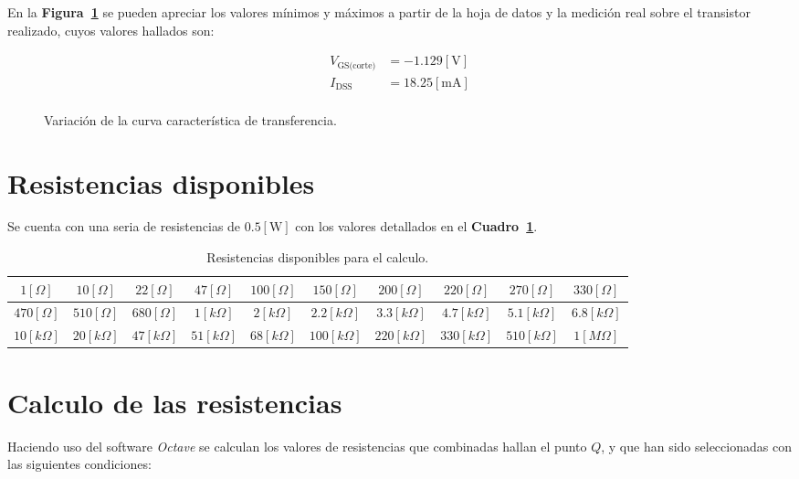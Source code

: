 \documentclass[letter,twoside,11pt]{article}
\begin{document}
En la \textbf{Figura~\ref{curve1}} se pueden apreciar los valores mínimos y
máximos a partir de la hoja de datos y la medición real sobre el transistor
realizado, cuyos valores hallados son:

\begin{equation*}
    \begin{split}
        V_{\text{GS(corte)}} &= -1.129[\text{V}]\\
        I_{\text{DSS}} &= 18.25[\text{mA}]\\
    \end{split}
\end{equation*}

\begin{figure}[!h]
    \centering
    
    \caption{Variación de la curva característica de transferencia.}
    \label{curve1}
\end{figure}

\section{Resistencias disponibles}
Se cuenta con una seria de resistencias de $0.5[\text{W}]$ con los valores
detallados en el \textbf{Cuadro~\ref{resistencias}}.

\begin{table}[!h]
\begin{center}
    \begin{tabular}{|c|c|c|c|c|c|c|c|c|c|}
    \hline
    $1[\Omega]$ & $10[\Omega]$ & $22[\Omega]$ & $47[\Omega]$ & $100[\Omega]$ &
    $150[\Omega]$ & $200[\Omega]$ & $220[\Omega]$ & $270[\Omega]$ &
    $330[\Omega]$
    \tabularnewline \hline
    $470[\Omega]$ & $510[\Omega]$ & $680[\Omega]$ & $1[k{\Omega}]$ &
    $2[k{\Omega}]$ & $2.2[k{\Omega}]$ & $3.3[k{\Omega}]$ & $4.7[k{\Omega}]$ &
    $5.1[k{\Omega}]$ & $6.8[k{\Omega}]$
    \tabularnewline \hline
    $10[k{\Omega}]$ & $20[k{\Omega}]$ & $47[k{\Omega}]$ & $51[k{\Omega}]$ &
    $68[k{\Omega}]$ & $100[k{\Omega}]$ & $220[k{\Omega}]$ & $330[k{\Omega}]$ &
    $510[k{\Omega}]$ & $1[M{\Omega}]$
    \tabularnewline \hline
    \end{tabular}
\end{center}
\caption{Resistencias disponibles para el calculo.}
\label{resistencias}
\end{table}

\section{Calculo de las resistencias}
Haciendo uso del software \emph{Octave} se calculan los valores de resistencias
que combinadas hallan el punto $Q$, y que han sido seleccionadas con las
siguientes condiciones:
\end{document}
